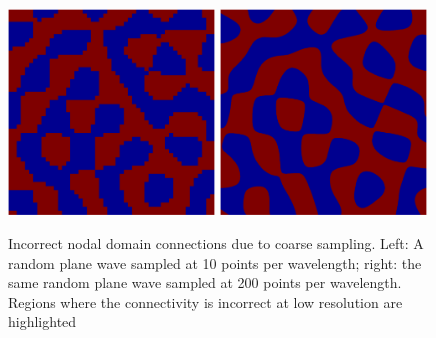 \documentclass{report}
\begin{document}
\begin{figure}
  \begin{center}
    \includegraphics[width=0.49\textwidth]{figs/interpolation/miscount_alpha=0.6283.eps}
    \includegraphics[width=0.49\textwidth]{figs/interpolation/miscount_alpha=0.0314.eps}
    \caption{Incorrect nodal domain connections due to coarse sampling. Left: A random plane wave sampled at 10 points per wavelength; right: the same random plane wave sampled at 200 points per wavelength. Regions where the connectivity is incorrect at low resolution are highlighted}
    \label{fig:miscounts}
  \end{center}
\end{figure}
\end{document}
